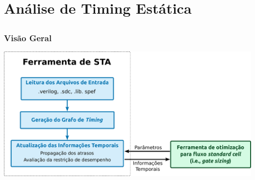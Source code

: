 \documentclass[10pt,a4paper]{beamer}
\begin{document}
	\section{Análise de Timing Estática}
	
		\subsection*{}
		\begin{frame}[t]
			\frametitle{Visão Geral}
			\begin{center}
				\includegraphics[width=\linewidth]{img/fluxograma_sta.pdf}
			\end{center}
		\end{frame}
		
\end{document}
